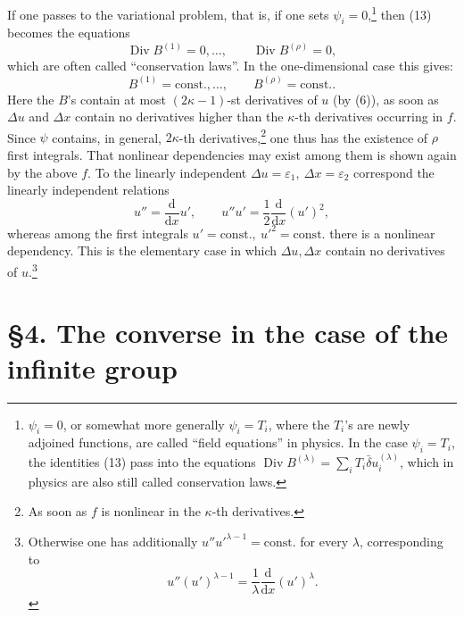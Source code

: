 \documentclass[11pt]{article}
\newcommand{\D}{\Delta}
\providecommand{\eps}{\varepsilon}
\providecommand{\dd}{\mathrm d}
\providecommand{\Div}{\operatorname{Div}}
\providecommand{\bd}{\bar{\delta}}
\providecommand{\dd}{\mathrm d}
\begin{document}
If one passes to the variational problem, that is, if one sets \(\psi_i=0\),\footnote{\(\psi_i=0\), or somewhat more generally \(\psi_i=T_i\), where the \(T_i\)'s are newly adjoined functions, are called ``field equations'' in physics. In the case \(\psi_i=T_i\), the identities (13) pass into the equations \(\Div B^{(\lambda)}=\sum_i T_i\bd u_i^{(\lambda)}\), which in physics are also still called conservation laws.} then (13) becomes the equations
\[
\Div B^{(1)}=0,\ldots,\qquad \Div B^{(\rho)}=0,
\]
which are often called ``conservation laws''. In the one-dimensional case this gives:
\[
B^{(1)}=\mathrm{const.},\ldots,\qquad B^{(\rho)}=\mathrm{const.}.
\]
Here the \(B\)'s contain at most \((2\kappa-1)\)-st derivatives of \(u\) (by (6)), as soon as \(\D u\) and \(\D x\) contain no derivatives higher than the \(\kappa\)-th derivatives occurring in \(f\). Since \(\psi\) contains, in general, \(2\kappa\)-th derivatives,\footnote{As soon as \(f\) is nonlinear in the \(\kappa\)-th derivatives.} one thus has the existence of \(\rho\) first integrals. That nonlinear dependencies may exist among them is shown again by the above \(f\). To the linearly independent \(\D u=\eps_1,\ \D x=\eps_2\) correspond the linearly independent relations
\[
u''=\frac{\dd}{\dd x}u',\qquad
u''u'=\frac12\frac{\dd}{\dd x}(u')^2,
\]
whereas among the first integrals \(u'=\mathrm{const.},\ u'^2=\mathrm{const.}\) there is a nonlinear dependency. This is the elementary case in which \(\D u,\D x\) contain no derivatives of \(u\).\footnote{Otherwise one has additionally \(u''u'^{\lambda-1}=\mathrm{const.}\) for every \(\lambda\), corresponding to
\[
u''(u')^{\lambda-1}=\frac1\lambda\frac{\dd}{\dd x}(u')^\lambda.
\]}

\section*{\S{}4. The converse in the case of the infinite group}
\end{document}
